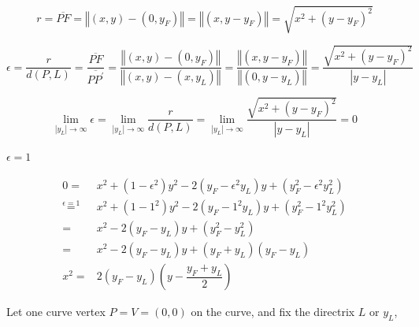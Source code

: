 \documentclass[
]{book}
\theoremstyle{definition}
\theoremstyle{definition}
\theoremstyle{definition}
\theoremstyle{definition}
\theoremstyle{remark}
\begin{document}
\[
r=\overline{PF}=\left\Vert \left(x,y\right)-\left(0,y_{{\scriptscriptstyle F}}\right)\right\Vert =\left\Vert \left(x,y-y_{{\scriptscriptstyle F}}\right)\right\Vert =\sqrt{x^{2}+\left(y-y_{{\scriptscriptstyle F}}\right)^{2}}
\]

\[
\epsilon=\dfrac{r}{d\left(P,L\right)}=\dfrac{\overline{PF}}{\overline{PP^{\prime}}}=\dfrac{\left\Vert \left(x,y\right)-\left(0,y_{{\scriptscriptstyle F}}\right)\right\Vert }{\left\Vert \left(x,y\right)-\left(x,y_{{\scriptscriptstyle L}}\right)\right\Vert }=\dfrac{\left\Vert \left(x,y-y_{{\scriptscriptstyle F}}\right)\right\Vert }{\left\Vert \left(0,y-y_{{\scriptscriptstyle L}}\right)\right\Vert }=\dfrac{\sqrt{x^{2}+\left(y-y_{{\scriptscriptstyle F}}\right)^{2}}}{\left|y-y_{{\scriptscriptstyle L}}\right|}
\]

\[
\lim_{\left|y_{L}\right|\rightarrow\infty}\epsilon=\lim_{\left|y_{L}\right|\rightarrow\infty}\dfrac{r}{d\left(P,L\right)}=\lim_{\left|y_{L}\right|\rightarrow\infty}\dfrac{\sqrt{x^{2}+\left(y-y_{{\scriptscriptstyle F}}\right)^{2}}}{\left|y-y_{{\scriptscriptstyle L}}\right|}=0
\]

\(\epsilon=1\)

\[
\begin{aligned}
0= & x^{2}+\left(1-\epsilon^{2}\right)y^{2}-2\left(y_{{\scriptscriptstyle F}}-\epsilon^{2}y_{{\scriptscriptstyle L}}\right)y+\left(y_{{\scriptscriptstyle F}}^{2}-\epsilon^{2}y_{{\scriptscriptstyle L}}^{2}\right)\\
\overset{\epsilon=1}{=} & x^{2}+\left(1-1^{2}\right)y^{2}-2\left(y_{{\scriptscriptstyle F}}-1^{2}y_{{\scriptscriptstyle L}}\right)y+\left(y_{{\scriptscriptstyle F}}^{2}-1^{2}y_{{\scriptscriptstyle L}}^{2}\right)\\
= & x^{2}-2\left(y_{{\scriptscriptstyle F}}-y_{{\scriptscriptstyle L}}\right)y+\left(y_{{\scriptscriptstyle F}}^{2}-y_{{\scriptscriptstyle L}}^{2}\right)\\
= & x^{2}-2\left(y_{{\scriptscriptstyle F}}-y_{{\scriptscriptstyle L}}\right)y+\left(y_{{\scriptscriptstyle F}}+y_{{\scriptscriptstyle L}}\right)\left(y_{{\scriptscriptstyle F}}-y_{{\scriptscriptstyle L}}\right)\\
x^{2}= & 2\left(y_{{\scriptscriptstyle F}}-y_{{\scriptscriptstyle L}}\right)\left(y-\dfrac{y_{{\scriptscriptstyle F}}+y_{{\scriptscriptstyle L}}}{2}\right)
\end{aligned}
\]

Let one curve vertex \(P=V=\left(0,0\right)\) on the curve, and fix the directrix \(L\) or \(y_{{\scriptscriptstyle L}}\),
\end{document}

